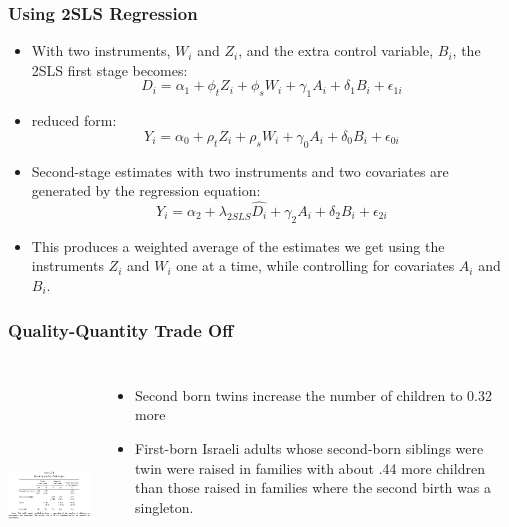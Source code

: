 \documentclass{beamer}
\begin{document}
\begin{frame}
\frametitle{Using 2SLS Regression}
\begin{itemize}
	\item With two instruments, $W_i$ and $Z_i$, and the extra control variable, $B_i$, the 2SLS first stage becomes:
$$D_i=\alpha_1 + \phi_t Z_i +\phi_s W_i +\gamma_1 A_i + \delta_1 B_i + \epsilon_{1i}$$
	\item reduced form: 
$$Y_i=\alpha_0 + \rho_t Z_i +\rho_s W_i + \gamma_0 A_i +\delta_0 B_i +  \epsilon_{0i}$$
	\item Second-stage estimates with two instruments and two covariates are generated by the regression equation: 
$$Y_i=\alpha_2+\lambda_{2SLS}\hat{D_i}+\gamma_2 A_i +\delta_2 B_i + \epsilon_{2i} $$
	\item This produces a weighted average of the estimates we get using the instruments $Z_i$ and $W_i$ one at a time, while controlling for covariates $A_i$ and $B_i$.

\end{itemize}

\end{frame}
\begin{frame}
\frametitle{Quality-Quantity Trade Off}

\begin{columns}
\includegraphics[width=6.5cm,height=6.5cm,keepaspectratio]{Table 3.4} 

\begin{itemize}
	\item Second born twins increase the number of children to 0.32 more
	\item First-born Israeli adults whose second-born siblings were twin were raised in families with about .44 more children than those raised in families where the second birth was a singleton.

\end{itemize}

\end{columns}
\end{frame}
\end{document}
